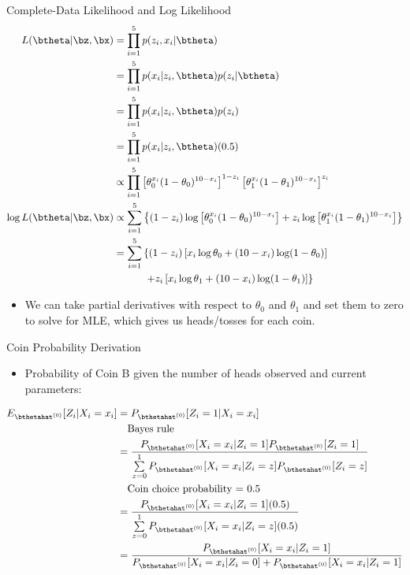 \documentclass[dvipdfmx,bigger,aspectratio=169]{beamer}
\begin{document}
\begin{frame}[allowframebreaks,label=,t]{Complete-Data Likelihood and Log Likelihood}
\begin{align*}
\label{eq:org06354f3}
  L(\btheta | \bz,\bx)
  &= \prod^{5}_{i=1} p(z_{i},x_{i} | \btheta)\\
  &= \prod^{5}_{i=1} p(x_{i} | z_{i}, \btheta) p(z_{i} | \btheta)\\
  &= \prod^{5}_{i=1} p(x_{i} | z_{i}, \btheta) p(z_{i})\\
  &= \prod^{5}_{i=1} p(x_{i} | z_{i}, \btheta) (0.5)\\
  &\propto \prod^{5}_{i=1}
    \left[ \theta_{0}^{x_{i}}(1-\theta_{0})^{10-x_{i}} \right]^{1-z_{i}}
    \left[ \theta_{1}^{x_{i}}(1-\theta_{1})^{10-x_{i}} \right]^{z_{i}}\\
  \log L(\btheta | \bz,\bx)
  &\propto \sum^{5}_{i=1}
    \left\{
    (1-z_{i}) \log \left[ \theta_{0}^{x_{i}}(1-\theta_{0})^{10-x_{i}} \right] +
    z_{i} \log \left[ \theta_{1}^{x_{i}}(1-\theta_{1})^{10-x_{i}} \right]
    \right\}\\
  &= \sum^{5}_{i=1}
    \left\{
    (1-z_{i}) \left[ x_{i}\log\theta_{0} + (10-x_{i})\log(1-\theta_{0})\right]
    \right.\\
  &~~~~~~~~~ \left.
    + z_{i} \left[ x_{i}\log\theta_{1} + (10-x_{i})\log(1-\theta_{1})\right]
    \right\}
\end{align*}
\begin{itemize}
\item We can take partial derivatives with respect to \(\theta_{0}\) and \(\theta_{1}\) and set them to zero to solve for MLE, which gives us heads/tosses for each coin.
\end{itemize}
\end{frame}

\begin{frame}[label={sec:org55b749f}]{Coin Probability Derivation}
\begin{itemize}
\item Probability of Coin B given the number of heads observed and current parameters:
\end{itemize}
\footnotesize
\begin{align*}
  E_{\bthetahat^{(0)}}[Z_{i} | X_{i} = x_{i}] &= P_{\bthetahat^{(0)}}[Z_{i} = 1 | X_{i} = x_{i}]\\
  &~~~\text{Bayes rule}\\
  &= \frac{P_{\bthetahat^{(0)}}[X_{i} = x_{i} | Z_{i} = 1] P_{\bthetahat^{(0)}}[Z_{i} = 1]}
          {\sum\limits^{1}_{z=0} P_{\bthetahat^{(0)}}[X_{i} = x_{i} | Z_{i} = z] P_{\bthetahat^{(0)}}[Z_{i} = z]}\\
  &~~~\text{Coin choice probability = 0.5}\\
  &= \frac{P_{\bthetahat^{(0)}}[X_{i} = x_{i} | Z_{i} = 1] (0.5)}
          {\sum\limits^{1}_{z=0} P_{\bthetahat^{(0)}}[X_{i} = x_{i} | Z_{i} = z] (0.5)}\\
  &= \frac{P_{\bthetahat^{(0)}}[X_{i} = x_{i} | Z_{i} = 1]}
          {P_{\bthetahat^{(0)}}[X_{i} = x_{i} | Z_{i} = 0] + P_{\bthetahat^{(0)}}[X_{i} = x_{i} | Z_{i} = 1]}
\end{align*}
\normalsize
\end{frame}
\end{document}
